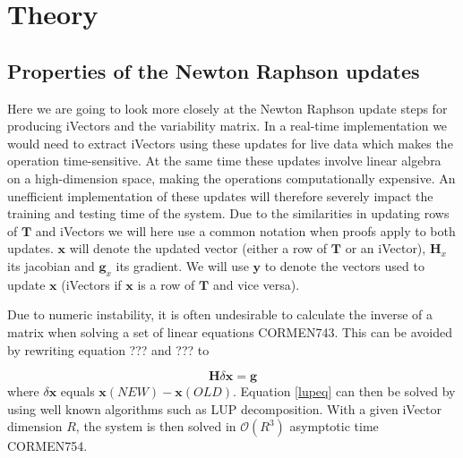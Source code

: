 \chapter{Theory}
\label{sect:Theory}

\section{Properties of the Newton Raphson updates}

Here we are going to look more closely at the Newton Raphson update steps for producing iVectors and the variability matrix. In a real-time implementation we would need to extract iVectors using these updates for live data which makes the operation time-sensitive. At the same time these updates involve linear algebra on a high-dimension space, making the operations computationally expensive. An unefficient implementation of these updates will therefore severely impact the training and testing time of the system.
Due to the similarities in updating rows of $\mathbf{T}$ and iVectors we will here use a common notation when proofs apply to both updates. $\mathbf{x}$ will denote the updated vector (either a row of $\mathbf{T}$ or an iVector), $\mathbf{H}_x$ its jacobian and $\mathbf{g}_x$ its gradient. We will use $\mathbf{y}$ to denote the vectors used to update $\mathbf{x}$ (iVectors if $\mathbf{x}$ is a row of $\mathbf{T}$ and vice versa).

Due to numeric instability, it is often undesirable to calculate the inverse of a matrix when solving a set of linear equations CORMEN743. This can be avoided by rewriting equation ??? and ??? to

\begin{equation}\label{lupeq}
\mathbf{H}\delta\mathbf{x} = \mathbf{g}
\end{equation}
where $\delta\mathbf{x}$ equals $\mathbf{x}(NEW)-\mathbf{x}(OLD)$. Equation \ref{lupeq} can then be solved by using well known algorithms such as LUP decomposition. With a given iVector dimension $R$, the system is then solved in $\mathcal{O}(R^3)$ asymptotic time CORMEN754. 

